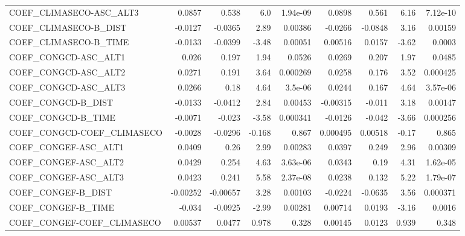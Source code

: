 \begin{tabular}{lrrrrrrrr}
COEF\_CLIMASECO-ASC\_ALT3        &      0.0857 &        0.538 &     6.0 & 1.94e-09 &     0.0898 &       0.561 &         6.16 &      7.12e-10 \\
COEF\_CLIMASECO-B\_DIST          &     -0.0127 &      -0.0365 &    2.89 &  0.00386 &    -0.0266 &     -0.0848 &         3.16 &       0.00159 \\
COEF\_CLIMASECO-B\_TIME          &     -0.0133 &      -0.0399 &   -3.48 &  0.00051 &    0.00516 &      0.0157 &        -3.62 &        0.0003 \\
COEF\_CONGCD-ASC\_ALT1           &       0.026 &        0.197 &    1.94 &   0.0526 &     0.0269 &       0.207 &         1.97 &        0.0485 \\
COEF\_CONGCD-ASC\_ALT2           &      0.0271 &        0.191 &    3.64 & 0.000269 &     0.0258 &       0.176 &         3.52 &      0.000425 \\
COEF\_CONGCD-ASC\_ALT3           &      0.0266 &         0.18 &    4.64 &  3.5e-06 &     0.0244 &       0.167 &         4.64 &      3.57e-06 \\
COEF\_CONGCD-B\_DIST             &     -0.0133 &      -0.0412 &    2.84 &  0.00453 &   -0.00315 &      -0.011 &         3.18 &       0.00147 \\
COEF\_CONGCD-B\_TIME             &     -0.0071 &       -0.023 &   -3.58 & 0.000341 &    -0.0126 &      -0.042 &        -3.66 &      0.000256 \\
COEF\_CONGCD-COEF\_CLIMASECO     &     -0.0028 &      -0.0296 &  -0.168 &    0.867 &   0.000495 &     0.00518 &        -0.17 &         0.865 \\
COEF\_CONGEF-ASC\_ALT1           &      0.0409 &         0.26 &    2.99 &  0.00283 &     0.0397 &       0.249 &         2.96 &       0.00309 \\
COEF\_CONGEF-ASC\_ALT2           &      0.0429 &        0.254 &    4.63 & 3.63e-06 &     0.0343 &        0.19 &         4.31 &      1.62e-05 \\
COEF\_CONGEF-ASC\_ALT3           &      0.0423 &        0.241 &    5.58 & 2.37e-08 &     0.0238 &       0.132 &         5.22 &      1.79e-07 \\
COEF\_CONGEF-B\_DIST             &    -0.00252 &     -0.00657 &    3.28 &  0.00103 &    -0.0224 &     -0.0635 &         3.56 &      0.000371 \\
COEF\_CONGEF-B\_TIME             &      -0.034 &      -0.0925 &   -2.99 &  0.00281 &    0.00714 &      0.0193 &        -3.16 &        0.0016 \\
COEF\_CONGEF-COEF\_CLIMASECO     &     0.00537 &       0.0477 &   0.978 &    0.328 &    0.00145 &      0.0123 &        0.939 &         0.348 \\

\end{tabular}
